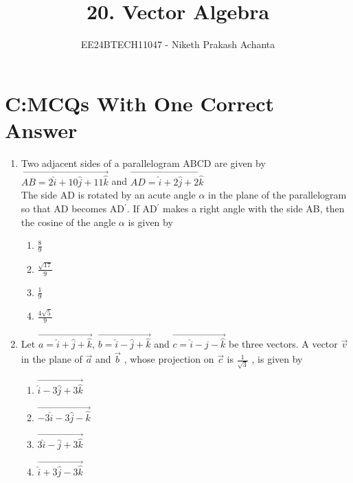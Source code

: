 \documentclass[journal,12pt,twocolumn]{IEEEtran}
\theoremstyle{remark}
\begin{document}

\vspace{3cm}

\title{20. Vector Algebra}
\author{EE24BTECH11047 - Niketh Prakash Achanta}
\maketitle
\newpage
\bigskip
\section{C:MCQs With One Correct Answer}
\renewcommand{\thefigure}{\theenumi}
\renewcommand{\thetable}{\theenumi}
\begin{enumerate}
	\item %
		Two adjacent sides of a parallelogram ABCD are given by $\vec{AB = 2\hat{i}+10\hat{j}+11\hat{k}}$ and $\vec{AD = \hat{i}+2\hat{j}+2\hat{k}}$ \\
		The side AD is rotated by an acute angle $\alpha$ in the plane of the parallelogram so that AD becomes AD$^{\prime}$. If AD$^{\prime}$ makes a right angle with the side AB, then the cosine of the angle $\alpha$ is given by \hfill{}\\
\begin{enumerate}
	\item $\frac{8}{9}$
	\item $\frac{\sqrt{17}}{9}$
	\item $\frac{1}{9}$
	\item $\frac{4\sqrt{5}}{9}$\\
\end{enumerate}

        \item %
		Let $\vec{a=\hat{i}+\hat{j}+\hat{k}}$, $\vec{b=\hat{i}-\hat{j}+\hat{k}}$ and $\vec{c=\hat{i}-\hat{j}-\hat{k}}$ be three vectors. A vector $\vec{v}$ in the plane of $\vec{a}$ and $\vec{b}$ , whose projection on $\vec{c}$ is $\frac{1}{\sqrt{3}}$ , is given by \hfill{}\\
\begin{enumerate}
	\item $\vec{\hat{i}-3\hat{j}+3\hat{k}}$
	\item $\vec{-3\hat{i}-3\hat{j}-\hat{k}}$
	\item $\vec{3\hat{i}-\hat{j}+3\hat{k}}$
	\item $\vec{\hat{i}+3\hat{j}-3\hat{k}}$\\
\end{enumerate}
       

\end{enumerate}
\end{document}
